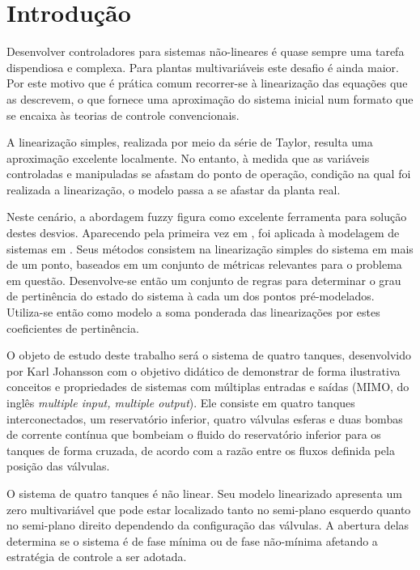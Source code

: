 %

\chapter{Introdução} \label{capIntrod}
Desenvolver controladores para sistemas não-lineares é quase sempre uma tarefa dispendiosa e complexa. Para plantas multivariáveis este desafio é ainda maior. Por este motivo que é prática comum recorrer-se à linearização das equações que as descrevem, o que fornece uma aproximação do sistema inicial num formato que se encaixa às teorias de controle convencionais.

A linearização simples, realizada por meio da série de Taylor, resulta uma aproximação excelente localmente. No entanto, à medida que as variáveis controladas e manipuladas se afastam do ponto de operação, condição na qual foi realizada a linearização, o modelo passa a se afastar da planta real.

Neste cenário, a abordagem fuzzy figura como excelente ferramenta para solução destes desvios. Aparecendo pela primeira vez em \cite{zadeh}, foi aplicada à modelagem de sistemas em \cite{takagiSugeno}. Seus métodos consistem na linearização simples do sistema em mais de um ponto, baseados em um conjunto de métricas relevantes para o problema em questão. Desenvolve-se então um conjunto de regras para determinar o grau de pertinência do estado do sistema à cada um dos pontos pré-modelados. Utiliza-se então como modelo a soma ponderada das linearizações por estes coeficientes de pertinência. 

O objeto de estudo deste trabalho será o sistema de quatro tanques, desenvolvido por Karl Johansson \cite{johansson2} com o objetivo didático de demonstrar de forma ilustrativa conceitos e propriedades de sistemas com múltiplas entradas e saídas (MIMO, do inglês \textit{multiple input, multiple output}). Ele consiste em quatro tanques interconectados, um reservatório inferior, quatro válvulas esferas e duas bombas de corrente contínua que bombeiam o fluido do reservatório inferior para os tanques de forma cruzada, de acordo com a razão entre os fluxos definida pela posição das válvulas.

O sistema de quatro tanques é não linear. Seu modelo linearizado apresenta um zero multivariável que pode estar localizado tanto no semi-plano esquerdo quanto no semi-plano direito dependendo da configuração das válvulas. A abertura delas determina se o sistema é de fase mínima ou de fase não-mínima afetando a estratégia de controle a ser adotada.


